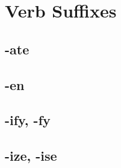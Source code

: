 \section{Verb Suffixes}

\subsection{-ate}

\subsection{-en}

\subsection{-ify, -fy}

\subsection{-ize, -ise}